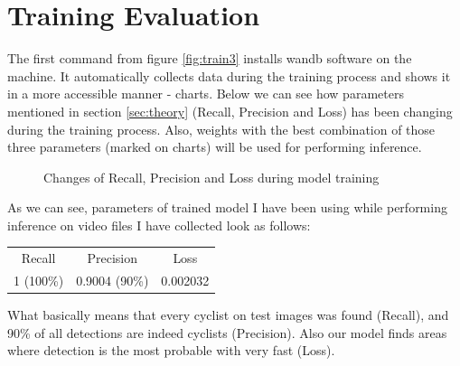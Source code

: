 \section{Training Evaluation}
\label{sec:eval}
The first command from figure \ref{fig:train3} installs wandb software on the machine. It automatically collects data during the training process and shows it in a more accessible manner - charts. Below we can see how parameters mentioned in section \ref{sec:theory} (Recall, Precision and Loss) has been changing during the training process. Also, weights with the best combination of those three parameters (marked on charts) will be used for performing inference.
\begin{figure} [h]
    \centering
    \caption{Changes of Recall, Precision and Loss during model training}
    \label{fig:eval1}
\end{figure}
\newline As we can see, parameters of trained model I have been using while performing inference on video files I have collected look as follows:
\begin{center}
    \begin{tabular}{ccc}
    Recall    & Precision     & Loss     \\
    1 (100\%) & 0.9004 (90\%) & 0.002032
    \end{tabular}
\end{center}
What basically means that every cyclist on test images was found (Recall), and 90\% of all detections are indeed cyclists (Precision). Also our model finds areas where detection is the most probable with very fast (Loss).

